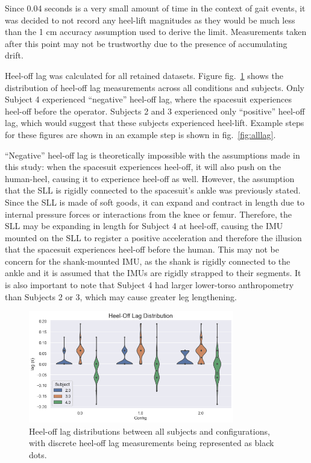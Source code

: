 \documentclass[defaultstyle,11pt]{comps}
\begin{document}
Since 0.04 seconds is a very small amount of time in the context of gait events, it was decided to not record any heel-lift magnitudes as they would be much less than the 1 cm accuracy assumption used to derive the limit.
Measurements taken after this point may not be trustworthy due to the presence of accumulating drift.

Heel-off lag was calculated for all retained datasets.
Figure fig.~\ref{fig:heeloffdist} shows the distribution of heel-off lag measurements across all conditions and subjects.
Only Subject 4 experienced ``negative'' heel-off lag, where the spacesuit experiences heel-off before the operator. Subjects 2 and 3 experienced only ``positive'' heel-off lag, which would suggest that these subjects experienced heel-lift.
Example steps for these figures are shown in an example step is shown in fig.~\ref{fig:alllag}.

``Negative'' heel-off lag is theoretically impossible with the assumptions made in this study: when the spacesuit experiences heel-off, it will also push on the human-heel, causing it to experience heel-off as well.
However, the assumption that the SLL is rigidly connected to the spacesuit's ankle was previously stated.
Since the SLL is made of soft goods, it can expand and contract in length due to internal pressure forces or interactions from the knee or femur.
Therefore, the SLL may be expanding in length for Subject 4 at heel-off, causing the IMU mounted on the SLL to register a positive acceleration and therefore the illusion that the spacesuit experiences heel-off before the human.
This may not be concern for the shank-mounted IMU, as the shank is rigidly connected to the ankle and it is assumed that the IMUs are rigidly strapped to their segments.
It is also important to note that Subject 4 had larger lower-torso anthropometry than Subjects 2 or 3, which may cause greater leg lengthening.

\begin{figure}
\hypertarget{fig:heeloffdist}{%
\centering
\includegraphics[width=0.8\textwidth,height=\textheight]{../fig/SA1/heelOffLag.png}
\caption{Heel-off lag distributions between all subjects and configurations, with discrete heel-off lag measurements being represented as black dots.}\label{fig:heeloffdist}
}
\end{figure}
\end{document}
